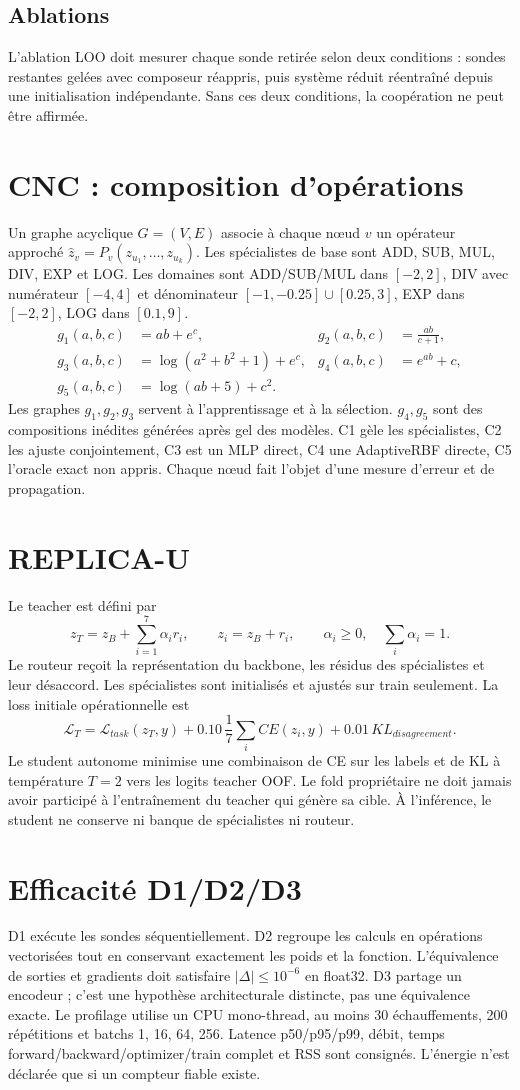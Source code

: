 \documentclass[11pt,a4paper]{article}
\begin{document}
\subsection{Ablations}
L'ablation LOO doit mesurer chaque sonde retirée selon deux conditions : sondes restantes gelées avec composeur réappris, puis système réduit réentraîné depuis une initialisation indépendante. Sans ces deux conditions, la coopération ne peut être affirmée.
\section{CNC : composition d'opérations}
Un graphe acyclique $G=(V,E)$ associe à chaque nœud $v$ un opérateur approché $\widehat z_v=P_v(z_{u_1},\ldots,z_{u_k})$. Les spécialistes de base sont ADD, SUB, MUL, DIV, EXP et LOG. Les domaines sont ADD/SUB/MUL dans $[-2,2]$, DIV avec numérateur $[-4,4]$ et dénominateur $[-1,-0.25]\cup[0.25,3]$, EXP dans $[-2,2]$, LOG dans $[0.1,9]$.
\[
\begin{aligned}
g_1(a,b,c)&=ab+e^c, & g_2(a,b,c)&=\frac{ab}{c+1},\\
g_3(a,b,c)&=\log(a^2+b^2+1)+e^c, & g_4(a,b,c)&=e^{ab}+c,\\
g_5(a,b,c)&=\log(ab+5)+c^2.
\end{aligned}
\]
Les graphes $g_1,g_2,g_3$ servent à l'apprentissage et à la sélection. $g_4,g_5$ sont des compositions inédites générées après gel des modèles. C1 gèle les spécialistes, C2 les ajuste conjointement, C3 est un MLP direct, C4 une AdaptiveRBF directe, C5 l'oracle exact non appris. Chaque nœud fait l'objet d'une mesure d'erreur et de propagation.
\section{REPLICA-U}
Le teacher est défini par
\[
z_T=z_B+\sum_{i=1}^{7}\alpha_i r_i,\qquad z_i=z_B+r_i,\qquad \alpha_i\geq0,\quad\sum_i\alpha_i=1.
\]
Le routeur reçoit la représentation du backbone, les résidus des spécialistes et leur désaccord. Les spécialistes sont initialisés et ajustés sur train seulement. La loss initiale opérationnelle est
\[
\mathcal L_T=\mathcal L_{task}(z_T,y)+0.10\,\frac1{7}\sum_i CE(z_i,y)+0.01\,KL_{disagreement}.
\]
Le student autonome minimise une combinaison de CE sur les labels et de KL à température $T=2$ vers les logits teacher OOF. Le fold propriétaire ne doit jamais avoir participé à l'entraînement du teacher qui génère sa cible. À l'inférence, le student ne conserve ni banque de spécialistes ni routeur.
\section{Efficacité D1/D2/D3}
D1 exécute les sondes séquentiellement. D2 regroupe les calculs en opérations vectorisées tout en conservant exactement les poids et la fonction. L'équivalence de sorties et gradients doit satisfaire $|\Delta|\leq10^{-6}$ en float32. D3 partage un encodeur ; c'est une hypothèse architecturale distincte, pas une équivalence exacte. Le profilage utilise un CPU mono-thread, au moins 30 échauffements, 200 répétitions et batchs 1, 16, 64, 256. Latence p50/p95/p99, débit, temps forward/backward/optimizer/train complet et RSS sont consignés. L'énergie n'est déclarée que si un compteur fiable existe.
\end{document}
